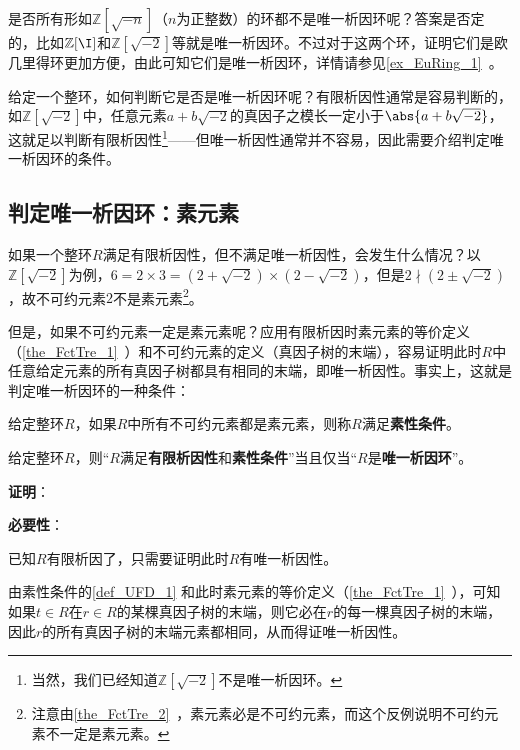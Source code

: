 是否所有形如$\mathbb{Z}[\sqrt{-n}]$（$n$为正整数）的环都不是唯一析因环呢？答案是否定的，比如$\mathbb{Z}[\I]$和$\mathbb{Z}[\sqrt{-2}]$等就是唯一析因环。不过对于这两个环，证明它们是欧几里得环更加方便，由此可知它们是唯一析因环，详情请参见\autoref{ex_EuRing_1}~。



给定一个整环，如何判断它是否是唯一析因环呢？有限析因性通常是容易判断的，如$\mathbb{Z}[\sqrt{-2}]$中，任意元素$a+b\sqrt{-2}$的真因子之模长一定小于$\abs{a+b\sqrt{-2}}$，这就足以判断有限析因性\footnote{当然，我们已经知道$\mathbb{Z}[\sqrt{-2}]$不是唯一析因环。}——但唯一析因性通常并不容易，因此需要介绍判定唯一析因环的条件。




\subsection{判定唯一析因环：素元素}



如果一个整环$R$满足有限析因性，但不满足唯一析因性，会发生什么情况？以$\mathbb{Z}[\sqrt{-2}]$为例，$6=2\times 3=(2+\sqrt{-2})\times(2-\sqrt{-2})$，但是$2\nmid(2\pm\sqrt{-2})$，故不可约元素$2$不是素元素\footnote{注意由\autoref{the_FctTre_2}~，素元素必是不可约元素，而这个反例说明不可约元素不一定是素元素。}。

但是，如果不可约元素一定是素元素呢？应用有限析因时素元素的等价定义（\autoref{the_FctTre_1}~）和不可约元素的定义（真因子树的末端），容易证明此时$R$中任意给定元素的所有真因子树都具有相同的末端，即唯一析因性。事实上，这就是判定唯一析因环的一种条件：



\begin{definition}{}\label{def_UFD_1}
给定整环$R$，如果$R$中所有不可约元素都是素元素，则称$R$满足\textbf{素性条件}。
\end{definition}


\begin{theorem}{}

给定整环$R$，则“$R$满足\textbf{有限析因性}和\textbf{素性条件}”当且仅当“$R$是\textbf{唯一析因环}”。

\end{theorem}


\textbf{证明}：

\textbf{必要性}：

已知$R$有限析因了，只需要证明此时$R$有唯一析因性。

由素性条件的\autoref{def_UFD_1}  和此时素元素的等价定义（\autoref{the_FctTre_1}~），可知如果$t\in R$在$r\in R$的某棵真因子树的末端，则它必在$r$的每一棵真因子树的末端，因此$r$的所有真因子树的末端元素都相同，从而得证唯一析因性。

